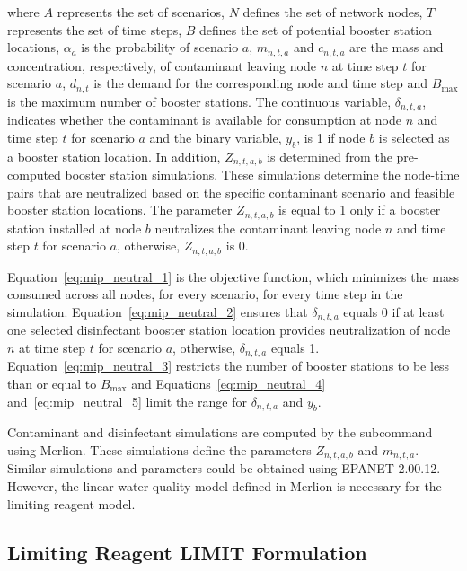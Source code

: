 where $A$ represents the set of scenarios, $N$ defines the set of network nodes, 
$T$ represents the set of time steps, $B$ defines the set of potential booster station locations,  
$\alpha_a$ is the probability of scenario $a$, 
$m_{n,t,a}$ and $c_{n,t,a}$ are the mass and concentration, respectively, of contaminant leaving node $n$ at time step $t$ for scenario $a$, 
$d_{n,t}$ is the demand for the corresponding node and time step 
and $B_{\max}$ is the maximum number of booster stations. The continuous variable, 
$\delta_{n,t,a}$, indicates whether the 
contaminant is available for consumption at node $n$ and time step $t$ for scenario $a$ and 
the binary variable, $y_b$, is 1 if node $b$ is selected as a booster 
station location. In addition, $Z_{n,t,a,b}$ is determined from the pre-computed booster station 
simulations. These simulations determine the node-time pairs that are 
neutralized based on the specific contaminant scenario and feasible booster 
station locations. The parameter $Z_{n,t,a,b}$ is equal to 1 only if a booster station 
installed at node $b$ neutralizes the contaminant leaving node $n$ 
and time step $t$ for scenario $a$, otherwise, $Z_{n,t,a,b}$ is 0.  

Equation~\ref{eq:mip_neutral_1} is the objective function, which 
minimizes the mass consumed across all nodes, for every scenario, for every 
time step in the simulation. Equation~\ref{eq:mip_neutral_2} ensures that $\delta_{n,t,a}$ 
equals 0 if at least one selected disinfectant booster station location provides 
neutralization of node $n$ at time step $t$ for scenario $a$, otherwise, 
$\delta_{n,t,a}$ equals 1. Equation~\ref{eq:mip_neutral_3} restricts the number  
of booster stations to be less than or equal to $B_{\max}$ and Equations~\ref{eq:mip_neutral_4}  
and~\ref{eq:mip_neutral_5} limit the range for $\delta_{n,t,a}$ and $y_{b}$.  

Contaminant and disinfectant simulations are computed by the  subcommand using Merlion. 
These simulations define the parameters $Z_{n,t,a,b}$ and $m_{n,t,a}$. 
Similar simulations and parameters could be obtained using EPANET 2.00.12. However, 
the linear water quality model defined in Merlion is necessary for the 
limiting reagent model.  

\subsection{Limiting Reagent LIMIT Formulation}\label{booster_mip_limit}

